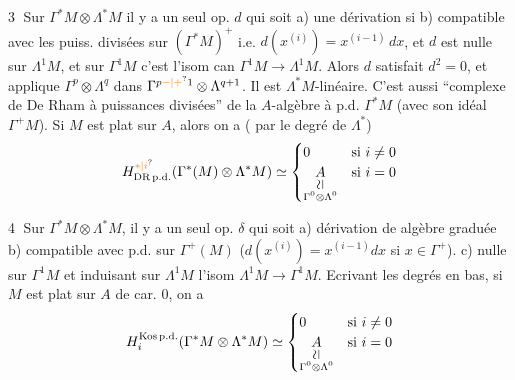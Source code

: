 
\textcircled{3} Sur $\Gamma^*M\otimes\Lambda^*M$  il y a un seul op. $d$ qui soit
 a) une dérivation si 
 b)  compatible avec les puiss. divisées sur $(\Gamma^*M)^+$ i.e. $d(x^{(i)})=x^{(i-1)}\,dx$, et
 $d$ est nulle sur $\Lambda^1M$, et sur $\Gamma^1 M$ c'est l'isom can $\Gamma^1 M\longrightarrow\Lambda^1 M$.
Alors $d$ satisfait $d^2=0$, et applique $\Gamma^p\otimes\Lambda^q$ dans $\Gamma^{p\unsure{-|+}1}\otimes\Lambda^{q+1}$. Il est $\Lambda^*M$-linéaire.
C'est aussi  ``complexe de De Rham à puissances divisées'' de la $A$-algèbre à p.d. $\Gamma^*M$ (avec son idéal $\Gamma^+M$).
Si $M$ est plat sur $A$, alors on a ( par le degré de $\Lambda^*$)
\[
 H^{\unsure{*|i}}_{\mathrm{DR\,p.d.}}(\Gamma^*(M)\otimes\Lambda^* M)
 \simeq\begin{cases}0&\text{si }i\ne0\\
 \underset{\substack{\rotatebox{90}{$\simeq$}\\\Gamma^0\otimes\Lambda^0}}{A}&\text{si }i=0\end{cases}
\]


\textcircled{4} Sur $\Gamma^*M\otimes\Lambda^*M$, il y a un seul op. $\delta$ qui soit
a) dérivation de algèbre graduée b) compatible avec p.d. sur $\Gamma^+(M)$ ($d(x^{(i)})=x^{(i-1)}dx$ si $x\in\Gamma^+$).
c) nulle sur $\Gamma^1 M$  et induisant sur $\Lambda^1M$ l'isom $\Lambda^1M\longrightarrow\Gamma^1M$.
  
Ecrivant les degrés en bas, si $M$ est plat  sur $A$  de car. $0$, on a
\[
 H_i^{\mathrm{Kos\,p.d.}}(\Gamma^*M\otimes\Lambda^*M)\simeq
 \begin{cases}0&\text{si }i\ne0\\
 \underset{\substack{\rotatebox{90}{$\simeq$}\\\Gamma^0\otimes\Lambda^0}}{A}&\text{si }i=0\end{cases}
\]

